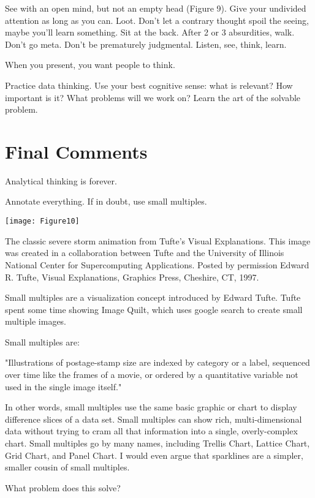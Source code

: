 \documentclass{tufte-handout}
\begin{document}
See with an open mind, but not an empty head (Figure 9).  Give your undivided attention as long as you can. Loot. Don't let a contrary thought spoil the seeing, maybe you'll learn something.  Sit at the back.  After 2 or 3 absurdities, walk. Don't go meta. Don't be prematurely judgmental. Listen, see, think, learn. 

When you present, you want people to think.

Practice data thinking.  Use your best cognitive sense: what is relevant? How important is it?  What problems will we work on? Learn the art of the solvable problem.

\section{Final Comments}

Analytical thinking is forever.

Annotate everything. If in doubt, use small multiples. 


\begin{marginfigure}
\texttt{[image: Figure10]}
\caption{The classic severe storm animation from Tufte's Visual Explanations. This image was created in a collaboration between Tufte and the University of Illinois National Center for Supercomputing Applications. Posted by permission Edward R. Tufte, Visual Explanations, Graphics Press, Cheshire, CT, 1997.}
\end{marginfigure}


Small multiples are a visualization concept introduced by Edward Tufte. Tufte spent some time showing Image Quilt, which uses google search to create small multiple images. 

Small multiples are:

"Illustrations of postage-stamp size are indexed by category or a label, sequenced over time like the frames of a movie, or ordered by a quantitative variable not used in the single image itself."

In other words, small multiples use the same basic graphic or chart to display difference slices of a data set. Small multiples can show rich, multi-dimensional data without trying to cram all that information into a single, overly-complex chart. Small multiples go by many names, including Trellis Chart, Lattice Chart, Grid Chart, and Panel Chart. I would even argue that sparklines are a simpler, smaller cousin of small multiples.

What problem does this solve?
\end{document}
